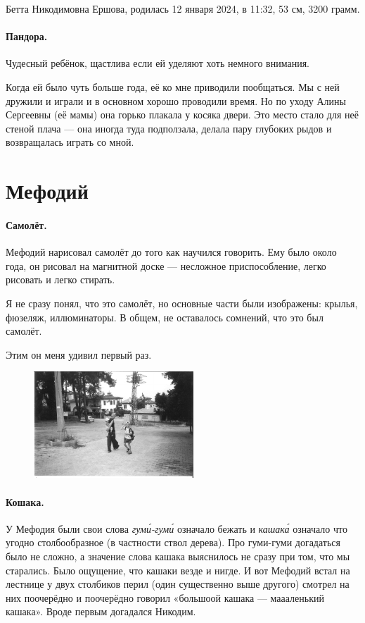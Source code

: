 \documentclass{book}
\begin{document}
Бетта Никодимовна Ершова, родилась 12 января 2024, в 11:32, 53 см, 3200 грамм.

\paragraph{Пандора.}
Чудесный ребёнок, щастлива если ей уделяют хоть немного внимания.

Когда ей было чуть больше года, её ко мне приводили пообщаться.
Мы с ней дружили и играли и в основном хорошо проводили время.
Но по уходу Алины Сергеевны (её мамы) она горько плакала у косяка двери.
Это место стало для неё стеной плача --- она иногда туда подползала, делала пару глубоких рыдов и возвращалась играть со мной.


\section*{Мефодий}

\paragraph{Самолёт.} Мефодий нарисовал самолёт до того как научился говорить.
Ему было около года, он рисовал на магнитной доске --- несложное приспособление, легко рисовать и легко стирать.

Я не сразу понял, что это самолёт, но основные части были изображены: крылья, фюзеляж, иллюминаторы.
В общем, не оставалось сомнений, что это был самолёт.

Этим он меня удивил первый раз.

\begin{figure}
\vskip-7mm
\centering
\includegraphics[width=60mm,angle=0]{photo/tosha-nikodim-mefody-bw}
\end{figure}

\paragraph{Кошака.} У Мефодия были свои слова \textit{гум\'{и}-гум\'{и}} означало бежать и \textit{кашак\'{а}} означало что угодно столбообразное (в частности ствол дерева).
Про гуми-гуми догадаться было не сложно, а значение слова кашака выяснилось не сразу при том, что мы старались.
Было ощущение, что кашаки везде и нигде.
И вот Мефодий встал на лестнице у двух столбиков перил (один существенно выше другого) смотрел на них поочерёдно и поочерёдно говорил «большоой кашака --- маааленький кашака».
Вроде первым догадался Никодим.
\end{document}
